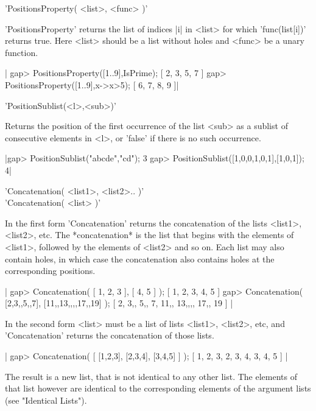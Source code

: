%

'PositionsProperty( <list>, <func> )'

'PositionsProperty'  returns the  list of  indices |i|  in <list> for which
'func(list[i])'  returns true. Here  <list> should be  a list without holes
and <func> be a unary function.

|   gap> PositionsProperty([1..9],IsPrime);
   [ 2, 3, 5, 7 ]
   gap> PositionsProperty([1..9],x->x>5);
   [ 6, 7, 8, 9 ]|

%

'PositionSublist(<l>,<sub>)'

Returns the position of the first occurrence of the list <sub> as a sublist
of consecutive elements in <l>, or 'false' if there is no such occurrence.

|gap> PositionSublist("abcde","cd");
3
gap> PositionSublist([1,0,0,1,0,1],[1,0,1]);
4|

%

'Concatenation( <list1>, <list2>.. )' \\
'Concatenation( <list> )'

In the first form 'Concatenation' returns  the concatenation of the lists
<list1>, <list2>, etc.  The *concatenation* is  the list that begins with
the elements of <list1>, followed  by the elements  of <list2> and so on.
Each list  may also contain holes,  in which  case the concatenation also
contains holes at the corresponding positions.

|    gap> Concatenation( [ 1, 2, 3 ], [ 4, 5 ] );
    [ 1, 2, 3, 4, 5 ]
    gap> Concatenation( [2,3,,5,,7], [11,,13,,,,17,,19] );
    [ 2, 3,, 5,, 7, 11,, 13,,,, 17,, 19 ] |

In the second form <list> must be a list  of lists <list1>, <list2>, etc,
and 'Concatenation' returns the concatenation of those lists.

|    gap> Concatenation( [ [1,2,3], [2,3,4], [3,4,5] ] );
    [ 1, 2, 3, 2, 3, 4, 3, 4, 5 ] |

The result is a new list, that is  not identical to any  other list.  The
elements of that list however are identical to the corresponding elements
of the argument lists (see "Identical Lists").

